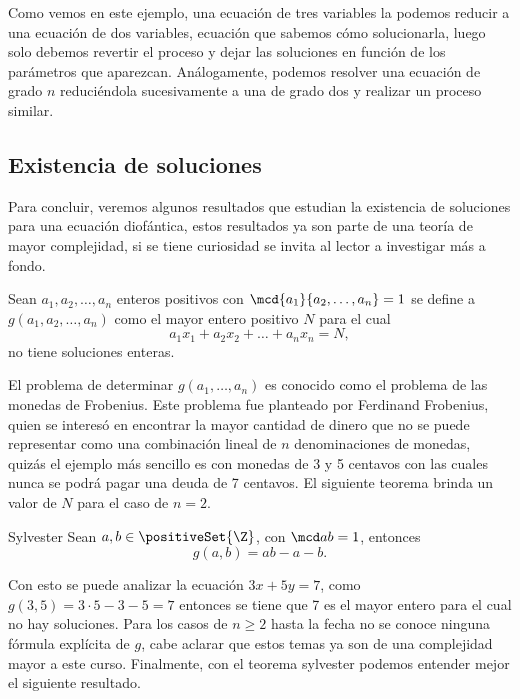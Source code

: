 Como vemos en este ejemplo, una ecuación de tres variables la podemos reducir a una ecuación de dos variables,
ecuación que sabemos cómo solucionarla, luego solo debemos revertir el proceso y dejar las soluciones en función
de los parámetros que aparezcan.
Análogamente, podemos resolver una ecuación de grado $n$ reduciéndola sucesivamente a una de grado dos y realizar un proceso similar.


\subsection{Existencia de soluciones}

Para concluir, veremos algunos resultados que estudian la existencia de soluciones para una ecuación diofántica, estos
resultados ya son parte de una teoría de mayor complejidad, si se tiene curiosidad se invita al lector a investigar más a fondo.

\begin{definition.box}{}{}
    Sean  $a_1,a_2,\ldots,a_n$ enteros positivos con $\mcd{a_1}{a_2,\ldots,a_n} = 1$ se define a $g(a_1,a_2,\ldots,a_n)$
    como el mayor entero positivo $N$ para el cual
    \[
        a_1 x_1 + a_2 x_2 + \ldots + a_n x_n = N,
    \]
    no tiene soluciones enteras.
\end{definition.box}

El problema de determinar $g(a_1,\ldots,a_n)$ es conocido como el problema de las monedas de Frobenius.
Este problema fue planteado por Ferdinand Frobenius, quien se interesó en encontrar la mayor cantidad de dinero que no
se puede representar como una combinación lineal de $n$ denominaciones de monedas,
quizás el ejemplo más sencillo es con monedas de 3 y 5 centavos con las cuales nunca se podrá pagar una deuda de 7 centavos.
El siguiente teorema brinda un valor de $N$ para el caso de $n=2$.

\begin{theorem.box}{Sylvester}{}
    Sean $a,b \in \positiveSet{\Z}$, con $\mcd a b = 1$, entonces
    \[
        g(a,b) = ab - a - b.
    \]
\end{theorem.box}
Con esto se puede analizar la ecuación $3x + 5y = 7$, como $g(3,5) = 3\cdot 5 - 3 - 5 = 7$
entonces se tiene que 7 es el mayor entero para el cual no hay soluciones.
Para los casos de $n\geq2$ hasta la fecha no se conoce ninguna fórmula explícita de $g$, cabe aclarar que estos temas
ya son de una complejidad mayor a este curso.
Finalmente, con el teorema sylvester podemos entender mejor el siguiente resultado.

